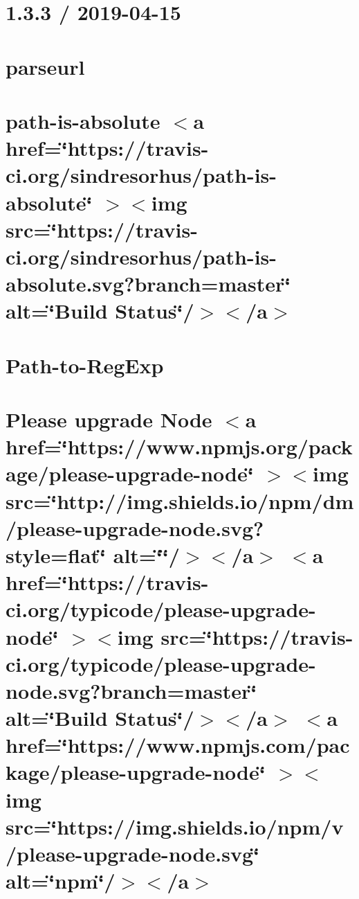 \documentclass[twoside]{book}
\newcommand{\+}{\discretionary{\mbox{\scriptsize$\hookleftarrow$}}{}{}}
\begin{document}
\chapter{1.3.3 / 2019-\/04-\/15}
\label{md_Backend_nodejs_node_modules_parseurl_HISTORY}

\chapter{parseurl}
\label{md_Backend_nodejs_node_modules_parseurl_README}

\chapter{path-\/is-\/absolute \texorpdfstring{$<$}{<}a href=\char`\"{}https\+://travis-\/ci.\+org/sindresorhus/path-\/is-\/absolute\char`\"{} \texorpdfstring{$>$}{>}\texorpdfstring{$<$}{<}img src=\char`\"{}https\+://travis-\/ci.\+org/sindresorhus/path-\/is-\/absolute.\+svg?branch=master\char`\"{} alt=\char`\"{}\+Build Status\char`\"{}/\texorpdfstring{$>$}{>}\texorpdfstring{$<$}{<}/a\texorpdfstring{$>$}{>}}
\label{md_Backend_nodejs_node_modules_path_is_absolute_readme}

\chapter{Path-\/to-\/\+Reg\+Exp}
\label{md_Backend_nodejs_node_modules_path_to_regexp_Readme}

\chapter{Please upgrade Node \texorpdfstring{$<$}{<}a href=\char`\"{}https\+://www.\+npmjs.\+org/package/please-\/upgrade-\/node\char`\"{} \texorpdfstring{$>$}{>}\texorpdfstring{$<$}{<}img src=\char`\"{}http\+://img.\+shields.\+io/npm/dm/please-\/upgrade-\/node.\+svg?style=flat\char`\"{} alt=\char`\"{}\char`\"{}/\texorpdfstring{$>$}{>}\texorpdfstring{$<$}{<}/a\texorpdfstring{$>$}{>} \texorpdfstring{$<$}{<}a href=\char`\"{}https\+://travis-\/ci.\+org/typicode/please-\/upgrade-\/node\char`\"{} \texorpdfstring{$>$}{>}\texorpdfstring{$<$}{<}img src=\char`\"{}https\+://travis-\/ci.\+org/typicode/please-\/upgrade-\/node.\+svg?branch=master\char`\"{} alt=\char`\"{}\+Build Status\char`\"{}/\texorpdfstring{$>$}{>}\texorpdfstring{$<$}{<}/a\texorpdfstring{$>$}{>} \texorpdfstring{$<$}{<}a href=\char`\"{}https\+://www.\+npmjs.\+com/package/please-\/upgrade-\/node\char`\"{} \texorpdfstring{$>$}{>}\texorpdfstring{$<$}{<}img src=\char`\"{}https\+://img.\+shields.\+io/npm/v/please-\/upgrade-\/node.\+svg\char`\"{} alt=\char`\"{}npm\char`\"{}/\texorpdfstring{$>$}{>}\texorpdfstring{$<$}{<}/a\texorpdfstring{$>$}{>}}
\label{md_Backend_nodejs_node_modules_please_upgrade_node_README}

\end{document}
